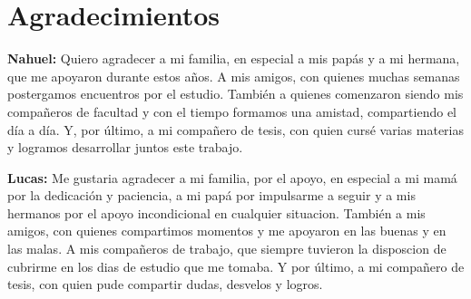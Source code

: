 \section*{Agradecimientos}

\textbf{Nahuel:} Quiero agradecer a mi familia, en especial a mis papás y a mi
hermana, que me apoyaron durante estos años. A mis amigos, con quienes muchas
semanas postergamos encuentros por el estudio. También a quienes
comenzaron siendo mis compañeros de facultad y con el tiempo formamos una
amistad, compartiendo el día a día. Y, por último, a mi compañero de tesis,
con quien cursé varias materias y logramos desarrollar juntos este trabajo.

\textbf{Lucas:} Me gustaria agradecer a mi familia, por el apoyo, en especial a mi mamá
por la dedicación y paciencia, a mi papá por impulsarme a seguir y a mis hermanos
por el apoyo incondicional en cualquier situacion. También a mis amigos, 
con quienes compartimos momentos y me
apoyaron en las buenas y en las malas. A mis compañeros de trabajo, que siempre tuvieron la disposcion
de cubrirme en los dias de estudio que me tomaba. Y por último, a mi compañero
de tesis, con quien pude compartir dudas, desvelos y logros.

